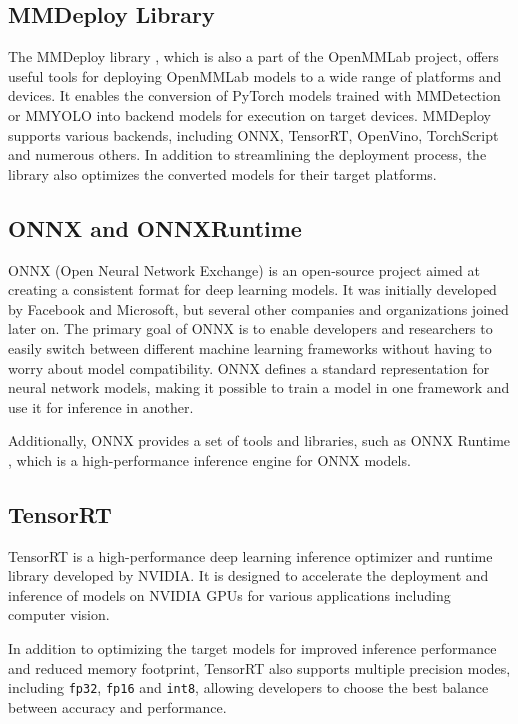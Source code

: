 \subsection{MMDeploy Library}

The MMDeploy library \cite{MMDeploy}, which is also a part of the OpenMMLab project,
offers useful tools for deploying OpenMMLab models to a wide range of platforms
and devices. It enables the conversion of PyTorch models trained with
MMDetection or MMYOLO into backend models for execution on target devices.
MMDeploy supports various backends, including ONNX, TensorRT, OpenVino,
TorchScript and numerous others. In addition to streamlining the deployment
process, the library also optimizes the converted models for their target
platforms.


\subsection{ONNX and ONNXRuntime}

ONNX (Open Neural Network Exchange) \cite{ONNX} is an open-source project aimed
at creating a consistent format for deep learning models. It was initially
developed by Facebook and Microsoft, but several other companies and
organizations joined later on. The primary goal of ONNX is to enable developers
and researchers to easily switch between different machine learning frameworks
without having to worry about model compatibility. ONNX defines a standard
representation for neural network models, making it possible to train a model in
one framework and use it for inference in another.

Additionally, ONNX provides a set of tools and libraries, such as ONNX Runtime
\cite{ONNXRuntime}, which is a high-performance inference engine for ONNX
models.


\subsection{TensorRT}

TensorRT  is a high-performance deep learning inference optimizer and runtime
library developed by NVIDIA. It is designed to accelerate the deployment and
inference of models on NVIDIA GPUs for various applications including computer
vision.

In addition to optimizing the target models for improved inference
performance and reduced memory footprint, TensorRT also supports multiple
precision modes, including \texttt{fp32}, \texttt{fp16} and \texttt{int8},
allowing developers to choose the best balance between accuracy and performance.


